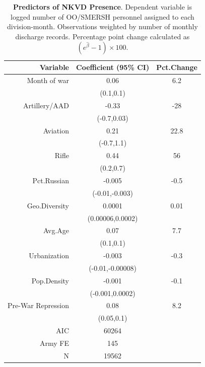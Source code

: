 \begin{table}[ht]
\centering
\caption{\textbf{Predictors of NKVD Presence}. Dependent variable is logged number of OO/SMERSH personnel assigned to each division-month. Observations weighted by number of monthly discharge records. Percentage point change calculated as $(e^{\hat{\beta}}-1)\times 100$.} 
\label{tab:reg_assign}
\begin{tabular}{rcc}
  \toprule
Variable & Coefficient (95\% CI) & Pct.Change \\ 
  \midrule
Month of war & 0.06 & 6.2 \\ 
   & (0.1,0.1) &  \\ 
  Artillery/AAD & -0.33 & -28 \\ 
   & (-0.7,0.03) &  \\ 
  Aviation & 0.21 & 22.8 \\ 
   & (-0.7,1.1) &  \\ 
  Rifle & 0.44 & 56 \\ 
   & (0.2,0.7) &  \\ 
  Pct.Russian & -0.005 & -0.5 \\ 
   & (-0.01,-0.003) &  \\ 
  Geo.Diversity & 0.0001 & 0.01 \\ 
   & (0.00006,0.0002) &  \\ 
  Avg.Age & 0.07 & 7.7 \\ 
   & (0.1,0.1) &  \\ 
  Urbanization & -0.003 & -0.3 \\ 
   & (-0.01,-0.00008) &  \\ 
  Pop.Density & -0.001 & -0.1 \\ 
   & (-0.001,0.0002) &  \\ 
  Pre-War Repression & 0.08 & 8.2 \\ 
   & (0.05,0.1) &  \\ 
   \midrule
AIC & 60264 &  \\ 
  Army FE & 145 &  \\ 
  N & 19562 &  \\ 
   \bottomrule
\end{tabular}
\end{table}
